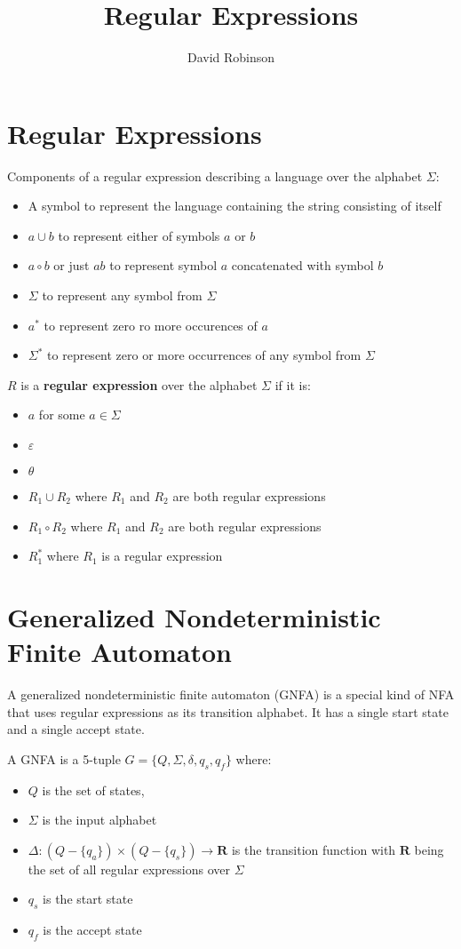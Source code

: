 \documentclass{article}
\title{Regular Expressions}
\author{David Robinson}
\date{}
\begin{document}
\maketitle

\section*{Regular Expressions}

Components of a regular expression describing a language over the alphabet $\Sigma$:
\begin{itemize}
    \item A symbol to represent the language containing the string consisting of itself
    \item $a\cup b$ to represent either of symbols $a$ or $b$
    \item $a\circ b$ or just $ab$ to represent symbol $a$ concatenated with symbol $b$
    \item $\Sigma$ to represent any symbol from $\Sigma$
    \item $a^*$ to represent zero ro more occurences of $a$
    \item $\Sigma^*$ to represent zero or more occurrences of any symbol from $\Sigma$
\end{itemize}

$R$ is a \textbf{regular expression} over the alphabet $\Sigma$ if it is:
\begin{itemize}
    \item $a$ for some $a\in\Sigma$
    \item $\varepsilon$
    \item $\theta$
    \item $R_1\cup R_2$ where $R_1$ and $R_2$ are both regular expressions
    \item $R_1\circ R_2$ where $R_1$ and $R_2$ are both regular expressions
    \item $R_1^*$ where $R_1$ is a regular expression
\end{itemize}

\section*{Generalized Nondeterministic Finite Automaton}

A generalized nondeterministic finite automaton (GNFA) is a special kind of NFA that uses regular expressions as its transition alphabet. It has a single start state and a single accept state.
\vspace{1em}

A GNFA is a 5-tuple $G=\{Q,\Sigma,\delta,q_s,q_f\}$ where:
\begin{itemize}
    \item $Q$ is the set of states,
    \item $\Sigma$ is the input alphabet
    \item $\Delta: (Q-\{q_a\})\times(Q-\{q_s\})\rightarrow\mathbf{R}$ is the transition function with $\mathbf{R}$ being the set of all regular expressions over $\Sigma$
    \item $q_s$ is the start state
    \item $q_f$ is the accept state
\end{itemize}
\end{document}
